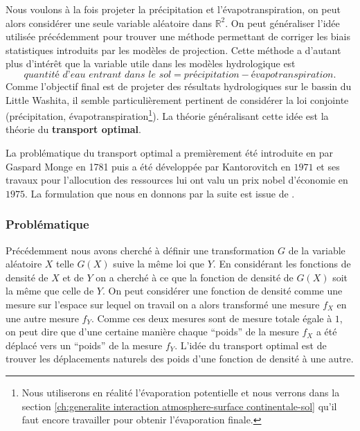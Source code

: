 \documentclass[a4paper,11pt]{article}
\numberwithin{equation}{section}
\begin{document}
Nous voulons à la fois projeter la précipitation et l'évapotranspiration, on peut alors considérer une seule variable aléatoire dans $\mathbb{R}^2$. On peut généraliser l'idée utilisée précédemment pour trouver une méthode permettant de corriger les biais statistiques introduits par les modèles de projection. Cette méthode a d'autant plus d'intérêt que la variable utile dans les modèles hydrologique est 
\begin{equation}
	\label{eq-Qin-pr-etp}
	\textit{quantité d'eau entrant dans le sol}=\textit{précipitation}-\textit{évapotranspiration}.
\end{equation}
Comme l'objectif final est de projeter des résultats hydrologiques sur le bassin du Little Washita, il semble particulièrement pertinent de considérer la loi conjointe (précipitation, évapotranspiration\footnote{Nous utiliserons en réalité l'évaporation potentielle et nous verrons dans la section \ref{ch:generalite interaction atmosphere-surface continentale-sol} qu'il faut encore travailler pour obtenir l'évaporation finale.}). La théorie généralisant cette idée est la théorie du \textbf{transport optimal}.

La problématique du transport optimal a premièrement été introduite en par Gaspard Monge en 1781 puis a été développée par Kantorovitch en $1971$ et ses travaux pour l'allocution des ressources lui ont valu un prix nobel d'économie en $1975$. La formulation que nous en donnons par la suite est issue de \cite{villani2003topics}.

\subsubsection{Problématique}
\label{ch:s-Problematique}

Précédemment nous avons cherché à définir une transformation $G$ de la variable aléatoire $X$ telle $G(X)$ suive la même loi que $Y$. En considérant les fonctions de densité de $X$ et de $Y$ on a cherché à ce que la fonction de densité de $G(X)$ soit la même que celle de $Y$. On peut considérer une fonction de densité comme une mesure sur l'espace sur lequel on travail on a alors transformé une mesure $f_X$ en une autre mesure $f_Y$. Comme ces deux mesures sont de mesure totale égale à $1$, on peut dire que d'une certaine manière chaque ``poids'' de la mesure $f_X$ a été déplacé vers un ``poids'' de la mesure $f_Y$. L'idée du transport optimal est de trouver les déplacements naturels des poids d'une fonction de densité à une autre.  
\end{document}
